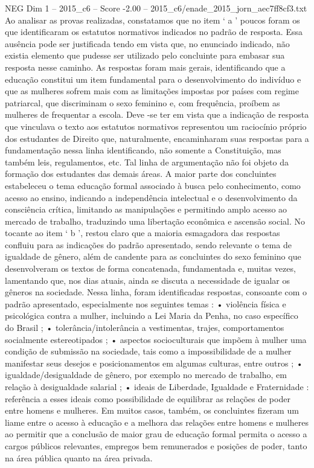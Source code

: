 \begin{textsample}{NEG Dim 1 – 2015\_c6 – Score -2.00 – 2015\_c6/enade\_2015\_jorn\_aec7ff8cf3.txt}
Ao analisar as provas realizadas, constatamos que no item ‘ a ’ poucos foram os que identificaram os estatutos normativos indicados no padrão de resposta.
Essa ausência pode ser justificada tendo em vista que, no enunciado indicado, não existia elemento que pudesse ser utilizado pelo concluinte para embasar sua resposta nesse caminho.
As respostas foram mais gerais, identificando que a educação constitui um item fundamental para o desenvolvimento do indivíduo e que as mulheres sofrem mais com as limitações impostas por países com regime patriarcal, que discriminam o sexo feminino e, com frequência, proíbem as mulheres de frequentar a escola.
Deve -se ter em vista que a indicação de resposta que vinculava o texto aos estatutos normativos representou um raciocínio próprio dos estudantes de Direito que, naturalmente, encaminharam suas respostas para a fundamentação nessa linha identificando, não somente a Constituição, mas também leis, regulamentos, etc.
Tal linha de argumentação não foi objeto da formação dos estudantes das demais áreas.
A maior parte dos concluintes estabeleceu o tema educação formal associado à busca pelo conhecimento, como acesso ao ensino, indicando a independência intelectual e o desenvolvimento da consciência crítica, limitando as manipulações e permitindo amplo acesso ao mercado de trabalho, traduzindo uma libertação econômica e ascensão social.
No tocante ao item ‘ b ’, restou claro que a maioria esmagadora das respostas confluiu para as indicações do padrão apresentado, sendo relevante o tema de igualdade de gênero, além de candente para as concluintes do sexo feminino que desenvolveram os textos de forma concatenada, fundamentada e, muitas vezes, lamentando que, nos dias atuais, ainda se discuta a necessidade de igualar os gêneros na sociedade.
Nessa linha, foram identificadas respostas, consoante com o padrão apresentado, especialmente nos seguintes temas : • violência física e psicológica contra a mulher, incluindo a Lei Maria da Penha, no caso específico do Brasil ; • tolerância/intolerância a vestimentas, trajes, comportamentos socialmente estereotipados ; • aspectos socioculturais que impõem à mulher uma condição de submissão na sociedade, tais como a impossibilidade de a mulher manifestar seus desejos e posicionamentos em algumas culturas, entre outros ; • igualdade/desigualdade de gênero, por exemplo no mercado de trabalho, em relação à desigualdade salarial ; • ideais de Liberdade, Igualdade e Fraternidade : referência a esses ideais como possibilidade de equilibrar as relações de poder entre homens e mulheres.
Em muitos casos, também, os concluintes fizeram um liame entre o acesso à educação e a melhora das relações entre homens e mulheres ao permitir que a conclusão de maior grau de educação formal permita o acesso a cargos públicos relevantes, empregos bem remunerados e posições de poder, tanto na área pública quanto na área privada.

\end{textsample}
